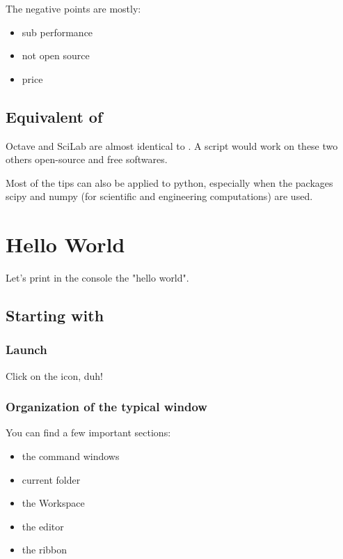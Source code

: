 		The negative points are mostly:
		\begin{itemize}
			\item sub performance
			\item not open source
			\item {\color{red} price}
		\end{itemize}

	\subsection{Equivalent of \matlab }

		Octave and SciLab are almost identical to \matlab. A \matlab script would work on these two others open-source and free softwares.

		Most of the tips can also be applied to python, especially when the packages scipy and numpy (for scientific and engineering computations) are used.


\section{Hello World}
	Let's print in the console the "hello world".
	\subsection{Starting with \matlab}
		\subsubsection{Launch \matlab}
		Click on the icon, duh!
		\subsubsection{Organization of the typical \matlab window}

		You can find a few important sections:
		\begin{itemize}
			\item the command windows \\
			\item current folder \\
			\item the Workspace \\
			\item the editor \\
			\item the ribbon \\
		\end{itemize}

